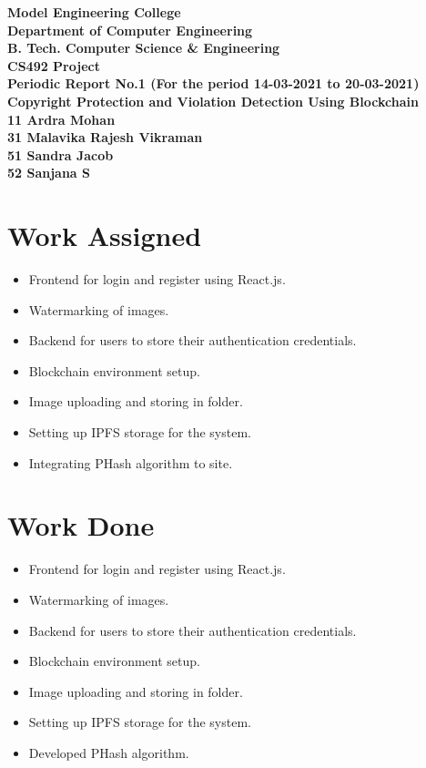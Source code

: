 \documentclass{article}
\begin{document}
\begin{center}
\textbf{
  Model Engineering College 
\\Department of Computer Engineering
\\B. Tech. Computer Science \& Engineering
\\CS492 Project
\\Periodic Report No.1 (For the period 14-03-2021 to 20-03-2021)
\\Copyright Protection and Violation Detection Using Blockchain
\\11 Ardra Mohan
\\31 Malavika Rajesh Vikraman
\\51 Sandra Jacob
\\52 Sanjana S}
\end{center}

\section{Work Assigned}
\begin{itemize}
\item Frontend for login and register using React.js.
\item Watermarking of images.
\item Backend for users to store their authentication credentials.
\item Blockchain environment setup.
\item Image uploading and storing in folder.
\item Setting up IPFS storage for the system.
\item Integrating PHash algorithm to site. 
\end{itemize}

\section{Work Done}
\begin{itemize}
\item Frontend for login and register using React.js.
\item Watermarking of images.
\item Backend for users to store their authentication credentials.
\item Blockchain environment setup.
\item Image uploading and storing in folder.
\item Setting up IPFS storage for the system.
\item Developed PHash algorithm.
\end{itemize}
\end{document}
